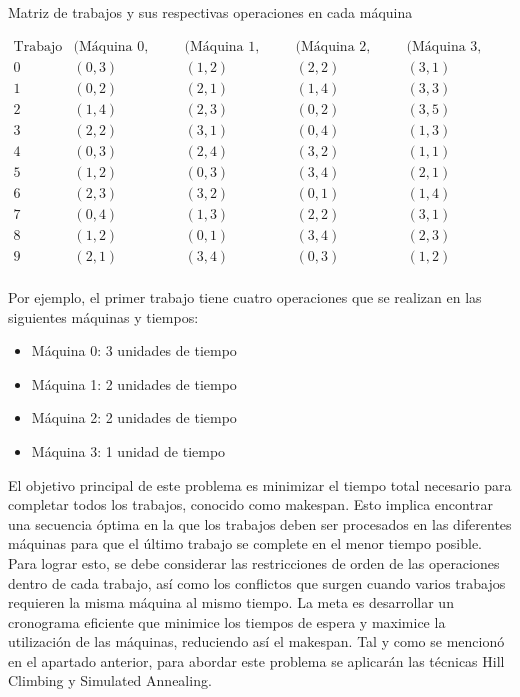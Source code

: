 \documentclass[11pt]{article}
\begin{document}
\begin{table}[H]
\centering
\caption{Matriz de trabajos y sus respectivas operaciones en cada máquina}
\[
\begin{array}{c|cccc}
\text{Trabajo} & \text{(Máquina 0, Tiempo)} & \text{(Máquina 1, Tiempo)} & \text{(Máquina 2, Tiempo)} & \text{(Máquina 3, Tiempo)} \\
\hline
0 & (0, 3) & (1, 2) & (2, 2) & (3, 1) \\
1 & (0, 2) & (2, 1) & (1, 4) & (3, 3) \\
2 & (1, 4) & (2, 3) & (0, 2) & (3, 5) \\
3 & (2, 2) & (3, 1) & (0, 4) & (1, 3) \\
4 & (0, 3) & (2, 4) & (3, 2) & (1, 1) \\
5 & (1, 2) & (0, 3) & (3, 4) & (2, 1) \\
6 & (2, 3) & (3, 2) & (0, 1) & (1, 4) \\
7 & (0, 4) & (1, 3) & (2, 2) & (3, 1) \\
8 & (1, 2) & (0, 1) & (3, 4) & (2, 3) \\
9 & (2, 1) & (3, 4) & (0, 3) & (1, 2) \\
\end{array}
\]
\label{tabla:matriz-trabajos}
\end{table}


Por ejemplo, el primer trabajo tiene cuatro operaciones que se realizan en las siguientes máquinas y tiempos:

\begin{multicols}{2}
    
\begin{itemize}
 \item Máquina 0: 3 unidades de tiempo
 \item Máquina 1: 2 unidades de tiempo
 \item Máquina 2: 2 unidades de tiempo
 \item Máquina 3: 1 unidad de tiempo
 \end{itemize}

\end{multicols} 

El objetivo principal de este problema es minimizar el tiempo total necesario para completar todos los trabajos, conocido como makespan. Esto implica encontrar una secuencia óptima en la que los trabajos deben ser procesados en las diferentes máquinas para que el último trabajo se complete en el menor tiempo posible. Para lograr esto, se debe considerar las restricciones de orden de las operaciones dentro de cada trabajo, así como los conflictos que surgen cuando varios trabajos requieren la misma máquina al mismo tiempo. La meta es desarrollar un cronograma eficiente que minimice los tiempos de espera y maximice la utilización de las máquinas, reduciendo así el makespan. Tal y como se mencionó en el apartado anterior, para abordar este problema se aplicarán las técnicas Hill Climbing y Simulated Annealing. 
\end{document}
